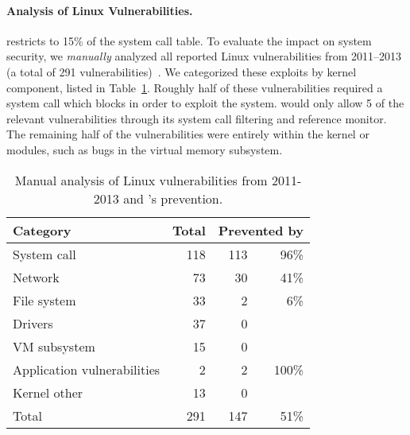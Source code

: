 \paragraph{Analysis of Linux Vulnerabilities.}
\sysname{} restricts \picoprocs{} to 15\% of the system call table.
To evaluate the impact on system security,
we \emph{manually} analyzed
all reported Linux vulnerabilities from 2011--2013 (a total
of 291 vulnerabilities)~\citep{linuxvuln}.
We categorized these exploits by kernel component, listed in Table~\ref{table:vulnerabilities}.
Roughly half of these vulnerabilities required a system
call  which \sysname{} blocks in order to exploit the system.
\sysname{} would only allow 5 of the relevant vulnerabilities
through its system call filtering and reference monitor.
The remaining half of the vulnerabilities were entirely within the kernel or modules,
    such as bugs in the virtual memory subsystem.

\begin{table}[t!b!]
\footnotesize
\centering
\begin{tabular}{|l|r|rr|}
\hline
{\bf Category } & {\bf Total} & \multicolumn{2}{|c|}{{\bf Prevented by \sysname{}}}\\

\hline
System call      & 118        &   \hspace{0.2in} 113 &96\% \\\hline 
Network          & 73         &   \hspace{0.2in}30 & 41\% \\\hline 
File system      & 33         &  \hspace{0.2in} 2  & 6\% \\\hline 
Drivers          & 37         &   \hspace{0.2in} 0 &\\\hline 
VM subsystem     & 15         &   \hspace{0.2in} 0 &\\\hline 
Application vulnerabilities & 2   & \hspace{0.2in} 2 & 100\% \\\hline 
Kernel other     & 13      & \hspace{0.2in} 0 &\\\hline 
Total            & 291     & \hspace{0.2in} 147 & 51\% \\\hline 
\end{tabular}
\caption[Analysis of Linux vulnerabilities prevented by \sysname{}]
{Manual analysis of Linux vulnerabilities from 2011-2013 and \sysname{}'s prevention.}
\label{table:vulnerabilities}
\end{table}



